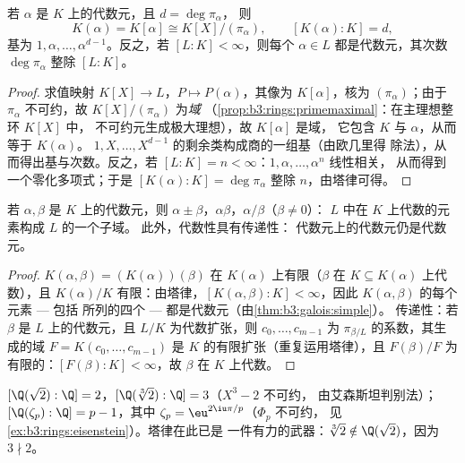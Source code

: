 \begin{theorem}\label{thm:b3:galois:simple}
若 $\alpha$ 是 $K$ 上的代数元，且 $d = \deg\pi_\alpha$，
则
\[
K(\alpha) = K[\alpha] \cong K[X]/(\pi_\alpha),
\qquad [K(\alpha) : K] = d,
\]
基为 $1, \alpha, \dots, \alpha^{d-1}$。反之，若
$[L:K] < \infty$，则每个 $\alpha \in L$ 都是代数元，其次数
$\deg \pi_\alpha$ 整除 $[L:K]$。
\end{theorem}

\begin{proof}
求值映射 $K[X] \to L$，$P \mapsto P(\alpha)$，其像为
$K[\alpha]$，核为 $(\pi_\alpha)$；由于 $\pi_\alpha$
不可约，故 $K[X]/(\pi_\alpha)$ 为\emph{域}
（\cref{prop:b3:rings:primemaximal}：在主理想整环 $K[X]$ 中，
不可约元生成极大理想），故 $K[\alpha]$ 是域，
它包含 $K$ 与 $\alpha$，从而等于 $K(\alpha)$。
$1, X, \dots, X^{d-1}$ 的剩余类构成商的一组基（由欧几里得
除法），从而得出基与次数。反之，若 $[L:K]
= n < \infty$：$1, \alpha, \dots, \alpha^n$ 线性相关，
从而得到一个零化多项式；于是 $[K(\alpha):K] =
\deg\pi_\alpha$ 整除 $n$，由塔律可得。
\end{proof}

\begin{corollary}\label{cor:b3:galois:algclosed}
若 $\alpha, \beta$ 是 $K$ 上的代数元，则 $\alpha \pm
\beta$，$\alpha\beta$，$\alpha/\beta$（$\beta \ne 0$）：
$L$ 中在 $K$ 上代数的元素构成 $L$ 的一个子域。
此外，代数性具有传递性：
代数元上的代数元仍是代数元。
\end{corollary}

\begin{proof}
$K(\alpha, \beta) = (K(\alpha))(\beta)$ 在
$K(\alpha)$ 上有限（$\beta$ 在 $K \subseteq K(\alpha)$ 上代数），且
$K(\alpha)/K$ 有限：由塔律，$[K(\alpha,\beta):K] <
\infty$，因此 $K(\alpha, \beta)$ 的每个元素 --- 包括
所列的四个 --- 都是代数元（由\cref{thm:b3:galois:simple}）。
传递性：若 $\beta$ 是 $L$ 上的代数元，且 $L/K$
为代数扩张，则 $c_0, \dots, c_{m-1}$ 为
$\pi_{\beta/L}$ 的系数，其生成的域 $F = K(c_0, \dots,
c_{m-1})$ 是 $K$ 的有限扩张（重复运用塔律），且 $F(\beta)/F$ 为
有限的：$[F(\beta):K] < \infty$，故 $\beta$ 在
$K$ 上代数。
\end{proof}

\begin{example}\label{ex:b3:galois:degrees}
$[\Q(\sqrt2):\Q] = 2$，$[\Q(\sqrt[3]2):\Q] = 3$（$X^3 - 2$ 不可约，
由艾森斯坦判别法）；$[\Q(\zeta_p):\Q] = p - 1$，其中
$\zeta_p = \eu^{2\iu\pi/p}$（$\Phi_p$ 不可约，
见\cref{ex:b3:rings:eisenstein}）。塔律在此已是
一件有力的武器：$\sqrt[3]2 \notin \Q(\sqrt2)$，因为 $3 \nmid 2$。
\end{example}

